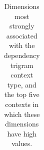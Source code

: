 \begin{table}
\begin{tabular}{lll}

\end{tabular}

\caption{Dimensions most strongly associated with the dependency trigram context type, and the top five contexts in which these dimensions have high values.} 
\label{tab:mi-examples}
\end{table}




